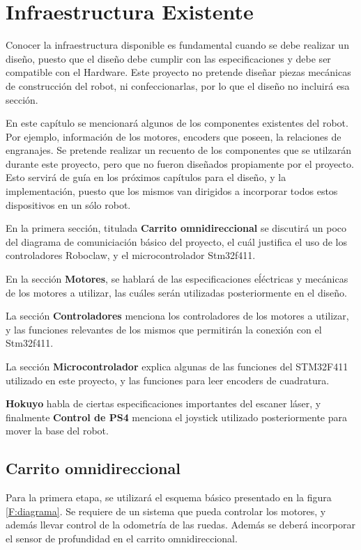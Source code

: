 \chapter{Infraestructura Existente}

Conocer la infraestructura disponible es fundamental cuando se debe realizar un diseño, puesto que el diseño debe cumplir con las especificaciones y debe ser compatible con el Hardware. Este proyecto no pretende diseñar piezas mecánicas de construcción del robot, ni confeccionarlas, por lo que el diseño no incluirá esa sección.

En este capítulo se mencionará algunos de los componentes existentes del robot. Por ejemplo, información de los motores, encoders que poseen, la relaciones de engranajes. Se pretende realizar un recuento de los componentes que se utilzarán durante este proyecto, pero que no fueron diseñados propiamente por el proyecto. Esto servirá de guía en los próximos capítulos para el diseño, y la implementación, puesto que los mismos van dirigidos a incorporar todos estos dispositivos en un sólo robot.

En la primera sección, titulada \textbf{Carrito omnidireccional} se discutirá un poco del diagrama de comuniciación básico del proyecto, el cuál justifica el uso de los controladores Roboclaw, y el microcontrolador Stm32f411.

En la sección \textbf{Motores}, se hablará de las especificaciones eĺéctricas y mecánicas de los motores a utilizar, las cuáles serán utilizadas posteriormente en el diseño.

La sección \textbf{Controladores} menciona los controladores de los motores a utilizar, y las funciones relevantes de los mismos que permitirán la conexión con el Stm32f411.

La sección \textbf{Microcontrolador} explica algunas de las funciones del STM32F411 utilizado en este proyecto, y las funciones para leer encoders de cuadratura.

\textbf{Hokuyo} habla de ciertas especificaciones importantes del escaner láser, y finalmente \textbf{Control de PS4} menciona el joystick utilizado posteriormente para mover la base del robot.

\newpage

\section{Carrito omnidireccional}
Para la primera etapa, se utilizará el esquema básico presentado en la figura \ref{F:diagrama}. Se requiere de un sistema que pueda controlar los motores, y además llevar control de la odometría de las ruedas. Además se deberá incorporar el sensor de profundidad en el carrito omnidireccional.

